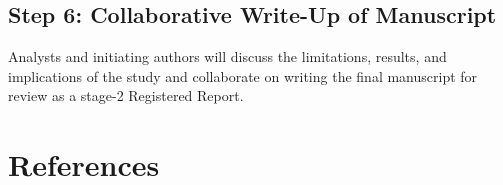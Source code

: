 \documentclass[
  english,
  man,floatsintext]{apa6}
\begin{document}
\hypertarget{step-6-collaborative-write-up-of-manuscript}{%
\subsection{Step 6: Collaborative Write-Up of Manuscript}\label{step-6-collaborative-write-up-of-manuscript}}

Analysts and initiating authors will discuss the limitations, results, and implications of the study and collaborate on writing the final manuscript for review as a stage-2 Registered Report.

\newpage

\hypertarget{references}{%
\section{References}\label{references}}

\begingroup
\setlength{\parindent}{-0.5in}
\setlength{\leftskip}{0.5in}
\end{document}
